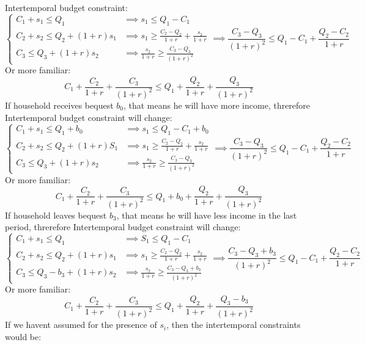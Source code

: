 \documentclass[11pt, oneside]{article}
\begin{document}
Intertemporal budget constraint:
\[
\begin{cases}
C_{1} + s_{1} \le Q_{1}  &\implies s_{1} \le Q_{1} - C_{1}\\
C_{2} + s_{2} \le Q_{2} + (1+r) s_{1} &\implies s_{1} \ge \frac{C_{2} -Q_{2}}{1+r} + \frac{s_{2}}{1+r}\\
C_{3} \le Q_{3} + (1+r)s_{2}&\implies \frac{s_{2}}{1+r} \ge \frac{C_{3} - Q_{3}}{(1+r)^{2}}
\end{cases} \implies \frac{C_{3} - Q_{3}}{(1+r)^{2}} \le Q_{1} - C_{1} + \frac{Q_{2}-C_{2}}{1 + r}
\]
Or more familiar:
\[
C_{1} + \frac{C_{2}}{1+r} +\frac{C_{3}}{(1+r)^{2}} \le Q_{1} + \frac{Q_{2}}{1+r} + \frac{Q_{3}}{(1+r)^{2}}
\]
If household receives bequest $ b_{0} $, that means he will have more income, threrefore Intertemporal budget constraint will change:
\[
\begin{cases}
C_{1} + s_{1} \le Q_{1} + b_{0}  &\implies s_{1} \le Q_{1} - C_{1} + b_{0}\\
C_{2} + s_{2} \le Q_{2} + (1+r) S_{1} &\implies s_{1} \ge \frac{C_{2} -Q_{2}}{1+r} + \frac{s_{2}}{1+r}\\
C_{3} \le Q_{3} + (1+r)s_{2}&\implies \frac{s_{2}}{1+r} \ge \frac{C_{3} - Q_{3}}{(1+r)^{2}}
\end{cases} \implies \frac{C_{3} - Q_{3}}{(1+r)^{2}} \le Q_{1} - C_{1} + \frac{Q_{2}-C_{2}}{1 + r}
\]
Or more familiar:
\[
C_{1} + \frac{C_{2}}{1+r} +\frac{C_{3}}{(1+r)^{2}} \le Q_{1} + b_{0} + \frac{Q_{2}}{1+r} + \frac{Q_{3}}{(1+r)^{2}}
\]
If household leaves bequest $ b_{3} $, that means he will have less income in the last period, threrefore Intertemporal budget constraint will change:
\[
\begin{cases}
C_{1} + s_{1} \le Q_{1}  &\implies S_{1} \le Q_{1} - C_{1} \\
C_{2} + s_{2} \le Q_{2} + (1+r) s_{1} &\implies s_{1} \ge \frac{C_{2} -Q_{2}}{1+r} + \frac{s_{2}}{1+r}\\
C_{3} \le Q_{3} - b_{3} + (1+r)s_{2}&\implies \frac{s_{2}}{1+r} \ge \frac{C_{3} - Q_{3}+b_{3}}{(1+r)^{2}}
\end{cases} \implies \frac{C_{3} - Q_{3} + b_{3}}{(1+r)^{2}} \le Q_{1} - C_{1} + \frac{Q_{2}-C_{2}}{1 + r}
\]
Or more familiar:
\[
C_{1} + \frac{C_{2}}{1+r} +\frac{C_{3}}{(1+r)^{2}} \le Q_{1}  + \frac{Q_{2}}{1+r} + \frac{Q_{3} - b_{3}}{(1+r)^{2}}
\]
If we havent assumed for the presence of $ s_{i} $, then the intertemporal constraints would be:
\end{document}
